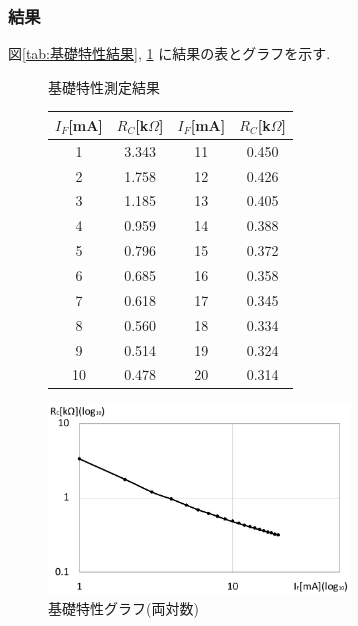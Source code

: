 \documentclass[titlepage]{jsarticle}
\begin{document}
        \subsubsection{結果}
            図\ref{tab:基礎特性結果}, \ref{fig:基礎特性グラフ}
            に結果の表とグラフを示す.

            \begin{figure}[ht]
                \def\@captype{table}
                \begin{minipage}{0.5\hsize}
                    \begin{center}
                        \caption{基礎特性測定結果}
                        \label{tab:基礎特性結果}
                        \begin{tabular}{c|c||c|c}
                            $I_F$[mA] & $R_C$[k$\Omega$] & $I_F$[mA] & $R_C$[k$\Omega$] \\ \hline
                            1 & 3.343 & 11 & 0.450 \\
                            2 & 1.758 & 12 & 0.426 \\
                            3 & 1.185 & 13 & 0.405 \\
                            4 & 0.959 & 14 & 0.388 \\
                            5 & 0.796 & 15 & 0.372 \\
                            6 & 0.685 & 16 & 0.358 \\
                            7 & 0.618 & 17 & 0.345 \\
                            8 & 0.560 & 18 & 0.334 \\
                            9 & 0.514 & 19 & 0.324 \\
                            10 & 0.478 & 20 & 0.314
                        \end{tabular}
                    \end{center}
                \end{minipage}
                \begin{minipage}{0.5\hsize}
                    \begin{center}
                        \includegraphics[width=8cm]{graphs/kihon.pdf}
                        \caption{基礎特性グラフ(両対数)}
                        \label{fig:基礎特性グラフ}
                    \end{center}
                \end{minipage}
            \end{figure}
\end{document}
